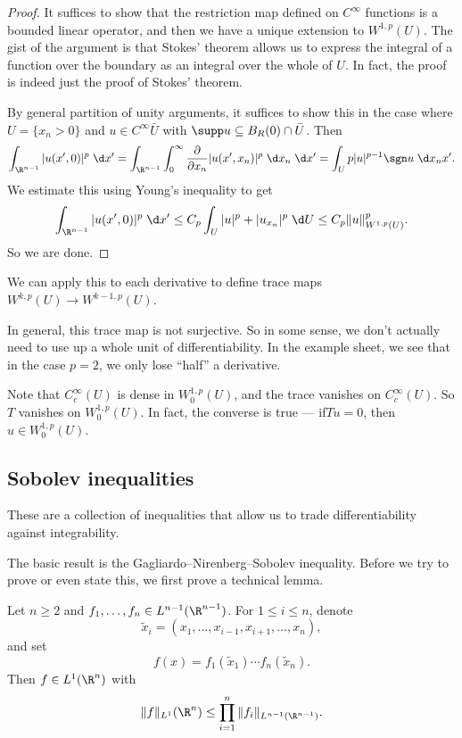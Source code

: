 \documentclass[a4paper]{article}
\begin{document}
\begin{proof}
  It suffices to show that the restriction map defined on $C^\infty$ functions is a bounded linear operator, and then we have a unique extension to $W^{1, p}(U)$. The gist of the argument is that Stokes' theorem allows us to express the integral of a function over the boundary as an integral over the whole of $U$. In fact, the proof is indeed just the proof of Stokes' theorem.

  By general partition of unity arguments, it suffices to show this in the case where $U = \{x_n > 0\}$ and $u \in C^\infty{\bar{U}}$ with $\supp u \subseteq B_R(0) \cap \bar{U}$. Then
  \[
    \int_{\R^{n - 1}} |u(x', 0)|^p \;\d x' = \int_{\R^{n - 1}} \int_0^\infty \frac{\partial}{\partial x_n} |u(x', x_n)|^p \;\d x_n \;\d x' = \int_U p |u|^{p - 1} \sgn u \;\d x_n x'.
  \]
  We estimate this using Young's inequality to get
  \[
    \int_{\R^{n - 1}} |u(x', 0)|^p \;\d x' \leq C_p \int_U |u|^p + |u_{x_n}|^p \;\d U \leq C_p \|u\|_{W^{1, p}(U)}^p.
  \]
  So we are done.
\end{proof}
We can apply this to each derivative to define trace maps $W^{k, p}(U) \to W^{k - 1, p}(U)$.

In general, this trace map is not surjective. So in some sense, we don't actually need to use up a whole unit of differentiability. In the example sheet, we see that in the case $p = 2$, we only lose ``half'' a derivative.

Note that $C_c^\infty(U)$ is dense in $W_0^{1, p}(U)$, and the trace vanishes on $C_c^\infty(U)$. So $T$ vanishes on $W_0^{1, p}(U)$. In fact, the converse is true --- if$Tu = 0$, then $u \in W_0^{1, p}(U)$.

\subsection{Sobolev inequalities}
These are a collection of inequalities that allow us to trade differentiability against integrability.

The basic result is the Gagliardo--Nirenberg--Sobolev inequality. Before we try to prove or even state this, we first prove a technical lemma.
\begin{lemma}
  Let $n \geq 2$ and $f_1, \ldots, f_n \in L^{n - 1}(\R^{n - 1})$. For $1 \leq i \leq n$, denote
  \[
    \tilde{x}_i = (x_1, \ldots, x_{i - 1}, x_{i + 1}, \ldots, x_n),
  \]
  and set
  \[
    f(x) = f_1(\tilde{x}_1) \cdots f_n(\tilde{x}_n).
  \]
  Then $f \in L^1(\R^n)$ with
  \[
    \|f\|_{L^1}(\R^n) \leq \prod_{i = 1}^n \|f_i\|_{L^{n - 1}(\R^{n - 1})}.
  \]
\end{lemma}
\end{document}
